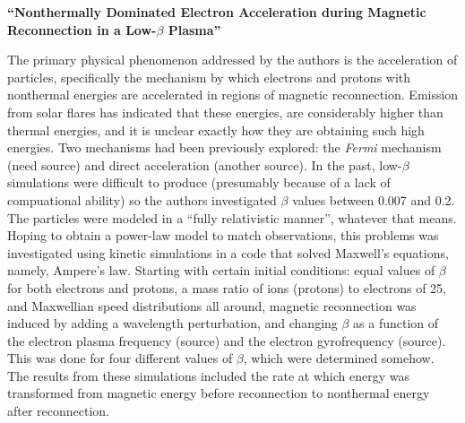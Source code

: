 \documentclass[12pt]{article}
\begin{document}
\begin{center}\large\textbf{
``Nonthermally Dominated Electron Acceleration during Magnetic
Reconnection in a Low-\boldmath$\beta$ Plasma''}
\end{center}

\noindent The primary physical phenomenon addressed by the authors is the
acceleration of particles, specifically the mechanism by which
electrons and protons with nonthermal energies are accelerated
in regions of magnetic reconnection.
Emission from solar flares has indicated that
these energies, are considerably higher than thermal energies, and
it is unclear exactly how they are obtaining such high energies.
Two mechanisms had been previously explored:
the \emph{Fermi} mechanism (need source)
and direct acceleration (another source).
In the past, low-$\beta$ simulations were difficult to produce
(presumably because of a lack of compuational ability)
so the authors investigated $\beta$ values between 0.007 and 0.2.
The particles were modeled in a ``fully relativistic manner'',
whatever that means.\\

\noindent 
Hoping to obtain a power-law model to match observations, this
problems was investigated using kinetic simulations in a code 
that solved Maxwell's
equations, namely, Ampere's law. Starting with certain initial
conditions: equal values of $\beta$ for both electrons and protons, a
mass ratio of ions (protons) to electrons of 25, and Maxwellian speed
distributions all around, magnetic reconnection was induced by adding
a wavelength perturbation, and changing $\beta$ as a function of the
electron plasma frequency (source) and the electron gyrofrequency
(source). This was done for four different values of $\beta$,
which were determined somehow.
The results from these simulations included the rate at which energy
was transformed from magnetic energy before reconnection to nonthermal
energy after reconnection. 
\\
\end{document}
